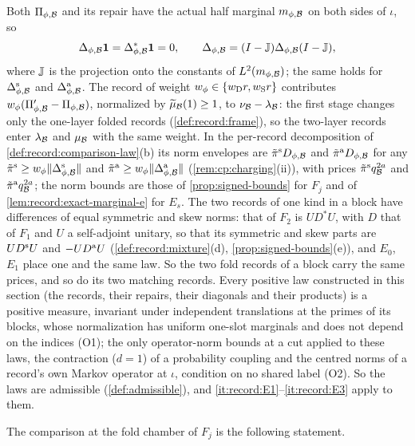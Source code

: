 Both $\Pi_{\phi,\mathcal B}$ and its repair have the actual half marginal
$m_{\phi,\mathcal B}$ on both sides of $\iota$, so
\begin{equation}\label{eq:record:zero-marginal}
 \Delta_{\phi,\mathcal B}\mathbf 1=\Delta_{\phi,\mathcal B}^*\mathbf 1=0,\qquad
 \Delta_{\phi,\mathcal B}=(I-\mathbb J)\Delta_{\phi,\mathcal B}(I-\mathbb J),
\end{equation}
where $\mathbb J$ is the projection onto the constants of $L^2(m_{\phi,\mathcal B})$; the
same holds for $\Delta^{\rm s}_{\phi,\mathcal B}$ and $\Delta^{\rm a}_{\phi,\mathcal B}$. The
record of weight $w_\phi\in\{w_{\rm D}r,w_{\rm S}r\}$ contributes
$w_\phi(\Pi'_{\phi,\mathcal B}-\Pi_{\phi,\mathcal B})$, normalized by
$\widetilde\mu_\mathcal B(1)\ge1$, to $\nu_\mathcal B-\lambda_\mathcal B$: the first stage changes
only the one-layer folded records (\cref{def:record:frame}), so the two-layer
records enter $\lambda_\mathcal B$ and $\mu_\mathcal B$ with the same weight. In the
per-record decomposition of \cref{def:record:comparison-law}(b) its norm
envelopes are $\tilde\pi^{\rm s}D_{\phi,\mathcal B}$ and $\tilde\pi^{\rm a}D_{\phi,\mathcal B}$
for any $\tilde\pi^{\rm s}\ge w_\phi\|\Delta^{\rm s}_{\phi,\mathcal B}\|$ and
$\tilde\pi^{\rm a}\ge w_\phi\|\Delta^{\rm a}_{\phi,\mathcal B}\|$
(\cref{rem:cp:charging}(ii)), with prices $\tilde\pi^{\rm s}q_\mathcal B^{2a}$ and
$\tilde\pi^{\rm a}q_\mathcal B^{2a}$; the norm bounds are those of
\cref{prop:signed-bounds} for $F_j$ and of \cref{lem:record:exact-marginal-e} for
$E_s$. The two records of one kind in a block have differences of equal
symmetric and skew norms: that of $F_2$ is $UD^*U$, with $D$ that of $F_1$ and
$U$ a self-adjoint unitary, so that its symmetric and skew parts are
$UD^{\rm s}U$ and $-UD^{\rm a}U$ (\cref{def:record:mixture}(d),
\cref{prop:signed-bounds}(e)), and $E_0$, $E_1$ place one and the same law. So
the two fold records of a block carry the same prices, and so do its two
matching records. Every positive law constructed in this section
(the records, their repairs, their diagonals and their products)
is a positive measure,
invariant under independent translations at the primes of its blocks, whose
normalization has uniform one-slot marginals and does not depend on the
indices (O1); the only operator-norm bounds at a cut applied to
these laws, the contraction ($d=1$) of a probability coupling
and the centred norms of
a record's own Markov operator at $\iota$, condition on no shared label (O2). So
the laws are admissible (\cref{def:admissible}), and
\ref{it:record:E1}--\ref{it:record:E3} apply to them.

The comparison at the fold chamber of $F_j$ is the following statement.

